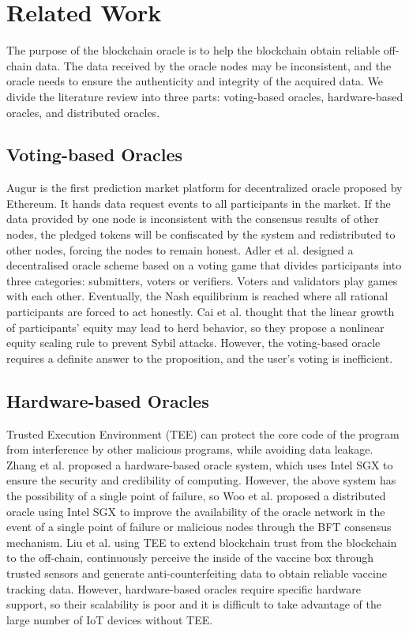 \documentclass[paper]{ieice}
\begin{document}
    
\section{Related Work}
\label{related_work}
The purpose of the blockchain oracle is to help the blockchain obtain reliable off-chain data\cite{ezzat2022blockchain}. The data received by the oracle nodes may be inconsistent, and the oracle needs to ensure the authenticity and integrity of the acquired data. We divide the literature review into three parts: voting-based oracles,  hardware-based oracles, and distributed oracles.

\subsection{Voting-based Oracles}
Augur is the first prediction market platform for decentralized oracle proposed by Ethereum. It hands data request events to all participants in the market. If the data provided by one node is inconsistent with the consensus results of other nodes, the pledged tokens will be confiscated by the system and redistributed to other nodes, forcing the nodes to remain honest\cite{peterson2015augur}. Adler et al.\cite{adler2018astraea} designed a decentralised oracle scheme based on a voting game that divides participants into three categories: submitters, voters or verifiers. Voters and validators play games with each other. Eventually, the Nash equilibrium is reached where all rational participants are forced to act honestly. Cai et al.\cite{cai2020truth} thought that the linear growth of participants' equity may lead to herd behavior, so they propose a nonlinear equity scaling rule to prevent Sybil attacks. However, the voting-based oracle requires a definite answer to the proposition, and the user's voting is inefficient.

\subsection{Hardware-based Oracles}
Trusted Execution Environment (TEE) can protect the core code of the program from interference by other malicious programs, while avoiding data leakage\cite{jauernig2020trusted}. Zhang et al.\cite{zhang2016town} proposed a hardware-based oracle system, which uses Intel SGX to ensure the security and credibility of computing. However, the above system has the possibility of a single point of failure, so Woo et al.\cite{woo2020distributed,chen2021tora} proposed a distributed oracle using Intel SGX to improve the availability of the oracle network in the event of a single point of failure or malicious nodes through the BFT consensus mechanism. Liu et al.\cite{liu2022extending} using TEE to extend blockchain trust from the blockchain to the off-chain, continuously perceive the inside of the vaccine box through trusted sensors and generate anti-counterfeiting data to obtain reliable vaccine tracking data. However, hardware-based oracles require specific hardware support, so their scalability is poor and it is difficult to take advantage of the large number of IoT devices without TEE.
\end{document}
